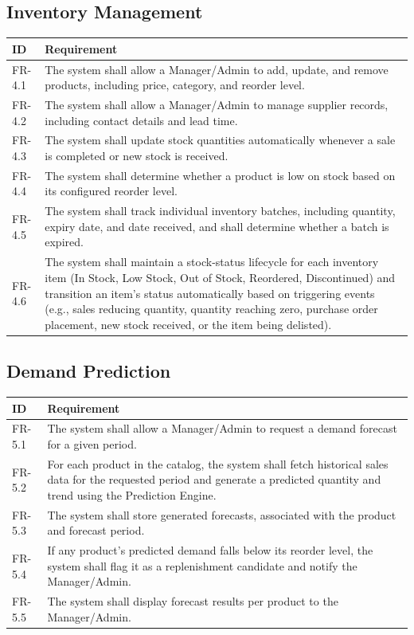 \documentclass[11pt,a4paper]{report}
\begin{document}
\subsection{Inventory Management}
\begin{longtable}{p{1.6cm} L{11.4cm}}
\toprule
\textbf{ID} & \textbf{Requirement} \\
\midrule
\endhead
FR-4.1 & The system shall allow a Manager/Admin to add, update, and remove products, including price, category, and reorder level. \\
FR-4.2 & The system shall allow a Manager/Admin to manage supplier records, including contact details and lead time. \\
FR-4.3 & The system shall update stock quantities automatically whenever a sale is completed or new stock is received. \\
FR-4.4 & The system shall determine whether a product is low on stock based on its configured reorder level. \\
FR-4.5 & The system shall track individual inventory batches, including quantity, expiry date, and date received, and shall determine whether a batch is expired. \\
FR-4.6 & The system shall maintain a stock-status lifecycle for each inventory item (In Stock, Low Stock, Out of Stock, Reordered, Discontinued) and transition an item's status automatically based on triggering events (e.g., sales reducing quantity, quantity reaching zero, purchase order placement, new stock received, or the item being delisted). \\
\bottomrule
\end{longtable}

\subsection{Demand Prediction}
\begin{longtable}{p{1.6cm} L{11.4cm}}
\toprule
\textbf{ID} & \textbf{Requirement} \\
\midrule
\endhead
FR-5.1 & The system shall allow a Manager/Admin to request a demand forecast for a given period. \\
FR-5.2 & For each product in the catalog, the system shall fetch historical sales data for the requested period and generate a predicted quantity and trend using the Prediction Engine. \\
FR-5.3 & The system shall store generated forecasts, associated with the product and forecast period. \\
FR-5.4 & If any product's predicted demand falls below its reorder level, the system shall flag it as a replenishment candidate and notify the Manager/Admin. \\
FR-5.5 & The system shall display forecast results per product to the Manager/Admin. \\
\bottomrule
\end{longtable}
\end{document}
